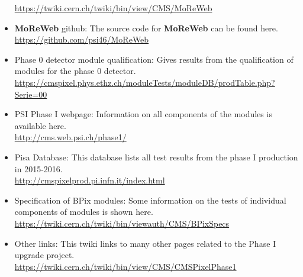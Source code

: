 \documentclass[a4paper,12pt,twoside]{article}
\begin{document}
\begin{appendices}
\begin{itemize}
\url{https://twiki.cern.ch/twiki/bin/view/CMS/MoReWeb}
\item \textbf{MoReWeb} github: The source code for \textbf{MoReWeb} can be found here. \\
\url{https://github.com/psi46/MoReWeb}
\item Phase 0 detector module qualification: Gives results from the qualification of modules for the phase 0 detector. \\
\url{https://cmspixel.phys.ethz.ch/moduleTests/moduleDB/prodTable.php?Serie=00}
\item PSI Phase I webpage: Information on all components of the modules is available here. \\
\url{http://cms.web.psi.ch/phase1/}
\item Pisa Database: This database lists all test results from the phase I production in 2015-2016. \\
\url{http://cmspixelprod.pi.infn.it/index.html}
\item Specification of BPix modules: Some information on the tests of individual components of modules is shown here. \\ 
\url{https://twiki.cern.ch/twiki/bin/viewauth/CMS/BPixSpecs}
\item Other links: This twiki links to many other pages related to the Phase I upgrade project. \\
\url{https://twiki.cern.ch/twiki/bin/view/CMS/CMSPixelPhase1}

\end{itemize}

\end{appendices}
\end{document}
